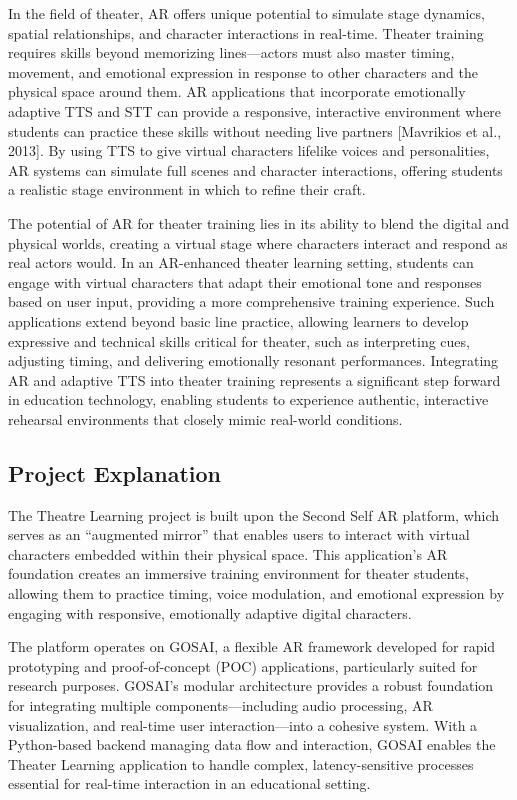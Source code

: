 In the field of theater, AR offers unique potential to simulate stage dynamics, spatial relationships, and character interactions in real-time. Theater training requires skills beyond memorizing lines—actors must also master timing, movement, and emotional expression in response to other characters and the physical space around them. AR applications that incorporate emotionally adaptive TTS and STT can provide a responsive, interactive environment where students can practice these skills without needing live partners [Mavrikios et al., 2013]. By using TTS to give virtual characters lifelike voices and personalities, AR systems can simulate full scenes and character interactions, offering students a realistic stage environment in which to refine their craft.

The potential of AR for theater training lies in its ability to blend the digital and physical worlds, creating a virtual stage where characters interact and respond as real actors would. In an AR-enhanced theater learning setting, students can engage with virtual characters that adapt their emotional tone and responses based on user input, providing a more comprehensive training experience. Such applications extend beyond basic line practice, allowing learners to develop expressive and technical skills critical for theater, such as interpreting cues, adjusting timing, and delivering emotionally resonant performances. Integrating AR and adaptive TTS into theater training represents a significant step forward in education technology, enabling students to experience authentic, interactive rehearsal environments that closely mimic real-world conditions.

\subsection{Project Explanation}
The Theatre Learning project is built upon the Second Self AR platform, which serves as an “augmented mirror” that enables users to interact with virtual characters embedded within their physical space. This application’s AR foundation creates an immersive training environment for theater students, allowing them to practice timing, voice modulation, and emotional expression by engaging with responsive, emotionally adaptive digital characters.

The platform operates on GOSAI, a flexible AR framework developed for rapid prototyping and proof-of-concept (POC) applications, particularly suited for research purposes. GOSAI’s modular architecture provides a robust foundation for integrating multiple components—including audio processing, AR visualization, and real-time user interaction—into a cohesive system. With a Python-based backend managing data flow and interaction, GOSAI enables the Theater Learning application to handle complex, latency-sensitive processes essential for real-time interaction in an educational setting.

